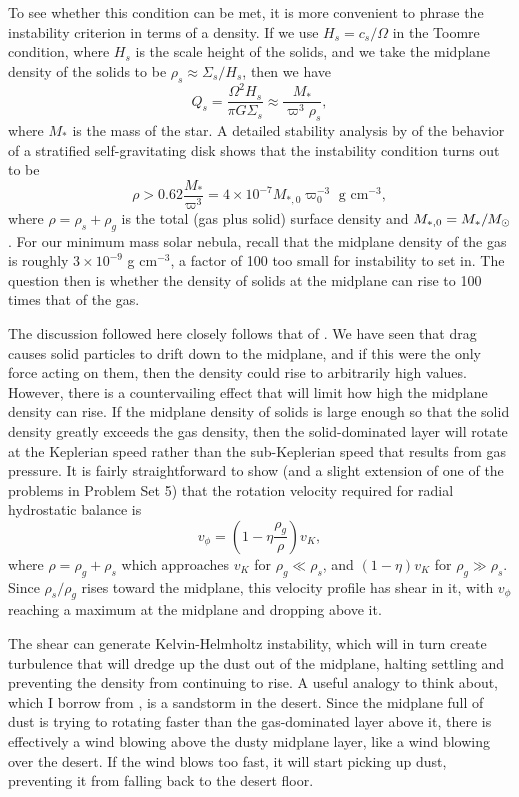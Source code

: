 To see whether this condition can be met, it is more convenient to phrase the instability criterion in terms of a density. If we use $H_s=c_s/\Omega$ in the Toomre condition, where $H_s$ is the scale height of the solids, and we take the midplane density of the solids to be $\rho_s \approx \Sigma_s/H_s$, then we have
\begin{equation}
Q_s  = \frac{\Omega^2 H_s}{\pi G \Sigma_s} \approx \frac{M_*}{\varpi^3 \rho_s},
\end{equation}
where $M_*$ is the mass of the star. A detailed stability analysis by \citet{Sekiya83a} of the behavior of a stratified self-gravitating disk shows that the instability condition turns out to be
\begin{equation}
\rho > 0.62\frac{M_*}{\varpi^3} = 4\times 10^{-7} M_{*,0} \varpi_0^{-3} \mbox{ g cm}^{-3},
\end{equation}
where $\rho = \rho_s + \rho_g$ is the total (gas plus solid) surface density and $M_{*,0}=M_*/M_{\odot}$. For our minimum mass solar nebula, recall that the midplane density of the gas is roughly $3\times 10^{-9}$ g cm$^{-3}$, a factor of 100 too small for instability to set in. The question then is whether the density of solids at the midplane can rise to 100 times that of the gas.

The discussion followed here closely follows that of \citet{youdin02a}. We have seen that drag causes solid particles to drift down to the midplane, and if this were the only force acting on them, then the density could rise to arbitrarily high values. However, there is a countervailing effect that will limit how high the midplane density can rise. If the midplane density of solids is large enough so that the solid density greatly exceeds the gas density, then the solid-dominated layer will rotate at the Keplerian speed rather than the sub-Keplerian speed that results from gas pressure. It is fairly straightforward to show (and a slight extension of one of the problems in Problem Set 5) that the rotation velocity required for radial hydrostatic balance is
\begin{equation}
v_{\phi} = \left(1-\eta \frac{\rho_g}{\rho}\right) v_K,
\end{equation}
where $\rho = \rho_g + \rho_s$ which approaches $v_K$ for $\rho_g \ll \rho_s$, and $(1-\eta) v_K$ for $\rho_g \gg \rho_s$. Since $\rho_s / \rho_g$ rises toward the midplane, this velocity profile has shear in it, with $v_{\phi}$ reaching a maximum at the midplane and dropping above it.

The shear can generate Kelvin-Helmholtz instability, which will in turn create turbulence that will dredge up the dust out of the midplane, halting settling and preventing the density from continuing to rise. A useful analogy to think about, which I borrow from \citet{youdin02a}, is a sandstorm in the desert. Since the midplane full of dust is trying to rotating faster than the gas-dominated layer above it, there is effectively a wind blowing above the dusty midplane layer, like a wind blowing over the desert. If the wind blows too fast, it will start picking up dust, preventing it from falling back to the desert floor.

